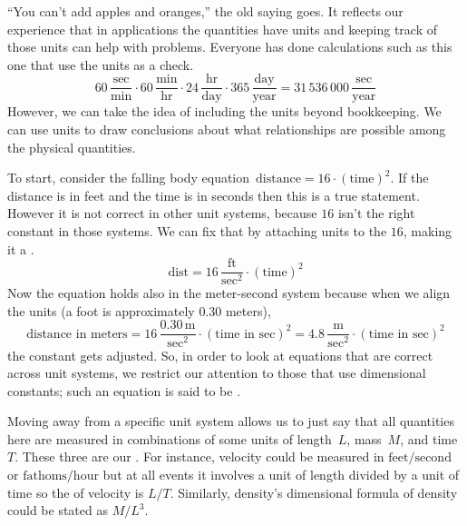 ``You can't add apples and oranges,'' the old saying goes.
It reflects our experience that in applications the quantities
have units and keeping track of those units can help with problems.
Everyone has done calculations such as this one 
that use the units as a check.
\begin{equation*}
  60\,\frac{\text{sec}}{\text{min}}
  \cdot 60\,\frac{\text{min}}{\text{hr}}
  \cdot 24\,\frac{\text{hr}}{\text{day}}
  \cdot 365\,\frac{\text{day}}{\text{year}}
  = 31\,536\,000\,\frac{\text{sec}}{\text{year}}
\end{equation*}
However, we can take the idea of including the units beyond bookkeeping.
We can use units to draw conclusions
about what relationships are possible among the physical quantities.

To start, consider the falling body 
equation~$\text{distance}=16\cdot(\text{time})^2$.
If the distance is in feet and the time is in seconds then this is a 
true statement. 
However
it is not correct in other unit systems, because $16$ isn't the
right constant in those systems.  
We can fix that by attaching units to the $16$, making it a 
.
\begin{equation*}
  \text{dist}=16\,\frac{\text{ft}}{\text{sec}^2}\cdot (\text{time})^2
\end{equation*}  
Now the equation holds also in the meter-second system   
because when we align the units (a foot is approximately $0.30$ meters), 
\begin{equation*}
  \text{distance in meters}=16\,\frac{0.30\,\text{m}}{\text{sec}^2}
                    \cdot (\text{time in sec})^2
                   =4.8\,\frac{\text{m}}{\text{sec}^2}
                    \cdot (\text{time in sec})^2
\end{equation*}
the constant gets adjusted.
So, in order to look at equations that are correct across unit systems, 
we restrict our attention
to those that use dimensional constants; such
an equation is 
said to be .

Moving away from a specific unit system allows us to just say that 
all quantities here are measured in combinations
of some units of length~$L$, mass~$M$, and time~$T$.
These three are our
.
For instance, velocity 
could be measured in $\text{feet}/\text{second}$
or $\text{fathoms}/\text{hour}$ but at all events it involves
a unit of length divided by a unit of time
so the  
of velocity is $L/T$.
Similarly, density's dimensional formula of density could be 
stated as $M/L^3$.

